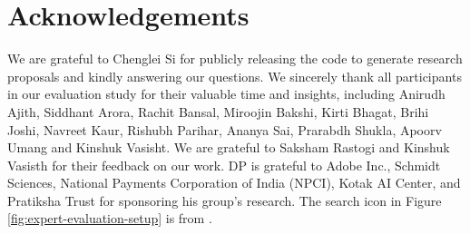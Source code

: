 \section*{Acknowledgements}

We are grateful to 
Chenglei Si for publicly releasing the code to generate research proposals
and kindly answering our questions.
We sincerely thank all participants in our evaluation study for their valuable time and insights, including Anirudh Ajith, Siddhant Arora, Rachit Bansal,  Miroojin Bakshi, Kirti Bhagat, Brihi Joshi, Navreet Kaur, Rishubh Parihar, Ananya Sai, Prarabdh Shukla, Apoorv Umang and Kinshuk Vasisht.  We are grateful to Saksham Rastogi and Kinshuk Vasisth for their feedback on our work. DP is grateful to Adobe Inc., Schmidt Sciences, National Payments Corporation of India (NPCI), Kotak AI Center, and Pratiksha Trust for sponsoring his group's research. The search icon in Figure \ref{fig:expert-evaluation-setup} is from \citet{rsetiawan2025search}.
